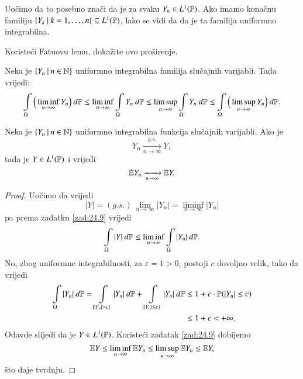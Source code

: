 Uo\v cimo da to posebno zna\v ci da je za svaku $Y_n \in L^1 (\mathbb{P})$.
Ako imamo kona\v cnu familiju $\{{Y_k} \: | \: {k = 1, \ldots, n}\} \subseteq L^1 (\mathbb{P})$, lako se vidi da da je ta familija uniformno integrabilna.

Koriste\' ci Fatuovu lemu, doka\v zite ovo pro\v sirenje.

\begin{zad}  \label{zad:24.9}
    Neka je $\{{Y_n} \: | \: {n \in \mathbb{N}}\}$ uniformno integrabilna familija slu\v cajnih varijabli.
    Tada vrijedi:
    \begin{equation*}
        \int\limits_\Omega \Big( \liminf\limits_{n \to \infty} Y_n \Big) \: d \mathbb{P} \leq \liminf\limits_{n \to \infty} \int\limits_\Omega Y_n \: d \mathbb{P} \leq \limsup\limits_{n \to \infty} \int\limits_\Omega Y_n \: d \mathbb{P} \leq \int\limits_\Omega \Big( \limsup\limits_{n \to \infty} Y_n \Big) \: d \mathbb{P}.
    \end{equation*}
\end{zad}

\begin{tm}  \label{tm:24.10}
    Neka je $\{{Y_n} \: | \: {n \in \mathbb{N}}\}$ uniformno integrabilna funkcija slu\v cajnih varijabli.
    Ako je
    \begin{equation*}
        Y_n \xrightarrow[n \to \infty]{g.s.} Y,
    \end{equation*}
    tada je $Y \in L^1 (\mathbb{P})$ i vrijedi
    \begin{equation*}
        \mathbb{E} Y_n \xrightarrow[n \to \infty]{} \mathbb{E} Y.
    \end{equation*}
\end{tm}

\begin{proof}
    Uo\v cimo da vrijedi
    \begin{equation*}
        |Y| = (g.s.) \: \lim\limits_{n \to \infty} |Y_n| = \liminf\limits_{n \to \infty} |Y_n|
    \end{equation*}
    pa prema zadatku \ref{zad:24.9} vrijedi
    \begin{equation*}
        \int\limits_\Omega |Y| \: d \mathbb{P} \leq \liminf\limits_{n \to \infty} \int\limits_\Omega |Y_n| \: d \mathbb{P}.
    \end{equation*}
    No, zbog uniformne integrabilnosti, za $\varepsilon = 1 > 0$, postoji $c$ dovoljno velik, tako da vrijedi
    \begin{equation}    \label{jed:24.11}
        \begin{aligned}
            \int\limits_\Omega |Y_n| \: d \mathbb{P} = \int\limits_{\{ |Y_n| > c \}} |Y_n| \: d \mathbb{P} + \int\limits_{\{ |Y_n| \leq c \}} |Y_n| \: d \mathbb{P} &\leq 1 + c \cdot \mathbb{P} (|Y_n| \leq c)\\
            &\leq 1 + c < +\infty.
        \end{aligned}
    \end{equation}
    Odavde slijedi da je $Y \in L^1 (\mathbb{P})$.
    Koriste\' ci zadatak \ref{zad:24.9} dobijemo
    \begin{equation*}
        \mathbb{E} Y \leq \liminf\limits_{n \to \infty} \mathbb{E} Y_n \leq \limsup\limits_{n \to \infty} \mathbb{E} Y_n \leq \mathbb{E} Y,
    \end{equation*}
    \v sto daje tvrdnju.
\end{proof}